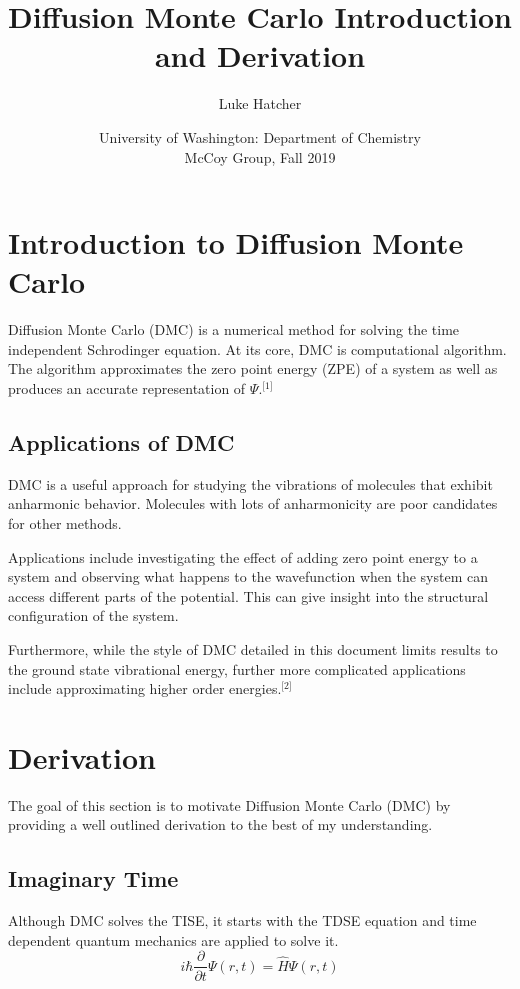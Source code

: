 \documentclass{article}
\begin{document}
\title{Diffusion Monte Carlo Introduction and Derivation}
\author{Luke Hatcher}
\date{University of Washington: Department of Chemistry \\ McCoy Group, Fall 2019}

\maketitle

\section{Introduction to Diffusion Monte Carlo}
Diffusion Monte Carlo (DMC) is a numerical method for solving the time independent Schrodinger equation. 
At its core, DMC is computational algorithm. 
The algorithm approximates the zero point energy (ZPE) of a system as well as produces an accurate representation of $\Psi$.$^\text{[1]}$
\subsection{Applications of DMC}
DMC is a useful approach for studying the vibrations of molecules that exhibit anharmonic behavior. 
Molecules with lots of anharmonicity are poor candidates for other methods.  

Applications include investigating the effect of adding zero point energy to a system and observing what happens to the wavefunction when the system can access different parts of the potential. 
This can give insight into the structural configuration of the system. 

Furthermore, while the style of DMC detailed in this document limits results to the ground state vibrational energy, further more complicated applications include approximating higher order energies.$^\text{[2]}$

\section{Derivation}
The goal of this section is to motivate Diffusion Monte Carlo (DMC) by providing a well outlined derivation to the best of my understanding.
\subsection{Imaginary Time}
Although DMC solves the TISE, it starts with the TDSE equation and time dependent quantum mechanics are applied to solve it.
\begin{equation} \label{eqn}
{i\hbar\frac{\partial}{\partial t}}\Psi(r,t)=\hat{H}{\Psi(r,t)}
\end{equation}
\end{document}
